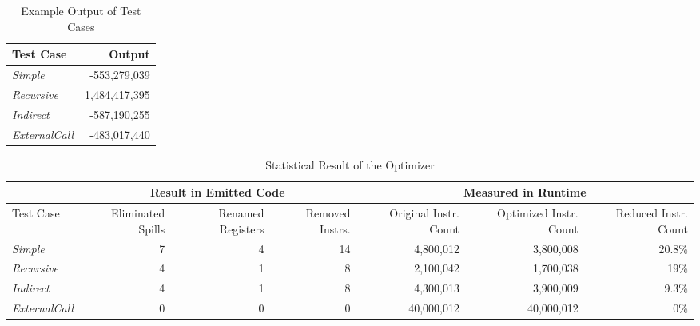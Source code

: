\documentclass[acmsmall]{acmart}
\begin{document}
\begin{table}[t]
	\caption{Example Output of Test Cases}
	\label{tab:output}
	\centering
	\begin{tabular}{|l|r|}
		\hline
		Test Case & Output \\
		\hline
		\textit{Simple} & -553,279,039 \\
		\hline
		\textit{Recursive} & 1,484,417,395 \\
		\hline
		\textit{Indirect} & -587,190,255 \\
		\hline
		\textit{ExternalCall} & -483,017,440 \\
		\hline
	\end{tabular}
	\bigskip

\end{table}

\begin{table}[t]
	\caption{Statistical Result of the Optimizer}
	\label{tab:stats}
	\centering
	\begin{tabular}{l||r|r|r||r|r|r}
		& \multicolumn{3}{c||}{Result in Emitted Code} & \multicolumn{3}{c}{Measured in Runtime} \\
		\hline
		Test Case & \multicolumn{1}{p{1.45cm}|}{\centering Eliminated Spills} & \multicolumn{1}{p{1.45cm}|}{\centering Renamed Registers} & \multicolumn{1}{p{1.45cm}||}{\centering Removed Instrs.} & \multicolumn{1}{p{1.67cm}|}{\centering Original Instr. Count} & \multicolumn{1}{p{1.67cm}|}{\centering Optimized Instr. Count} & \multicolumn{1}{p{1.67cm}}{\centering Reduced Instr. Count} \\
		\hline
		\textit{Simple} & 7 & 4 & 14 & 4,800,012 & 3,800,008 & 20.8\% \\
		\hline
		\textit{Recursive} & 4 & 1 & 8 & 2,100,042 & 1,700,038 & 19\% \\
		\hline
		\textit{Indirect} & 4 & 1 & 8 & 4,300,013 & 3,900,009 & 9.3\% \\
		\hline
		\textit{ExternalCall} & 0 & 0 & 0 & 40,000,012 & 40,000,012 & 0\% \\
	\end{tabular}
\end{table}
\end{document}
